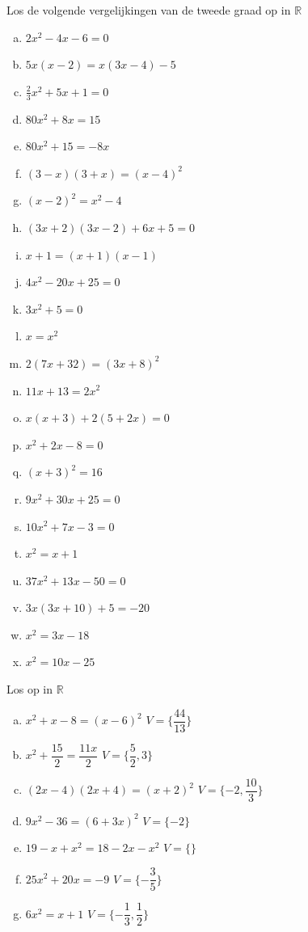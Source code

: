 \documentclass[12pt]{article}
\begin{document}
\begin{oefening}
  Los de volgende vergelijkingen van de tweede graad op in $\mathbb{R}$
  \begin{multicols}{2}
    \begin{enumerate}[(a)]
      \itemsep0.7em
    \item $2x^2-4x-6=0$
    \item $5x(x-2)=x(3x-4)-5$
    \item $\frac{2}{3}x^2+5x+1=0$
    \item $80x^2+8x=15$
    \item $80x^2+15=-8x$
    \item $(3-x)(3+x)=(x-4)^2$
    \item $(x-2)^2=x^2-4$
    \item $(3x+2)(3x-2)+6x+5=0$
    \item $x+1=(x+1)(x-1)$
    \item $4x^2-20x+25=0$
    \item $3x^2+5=0$
    \item $x=x^2$
    \item $2\left(7x+32\right)=(3x+8)^2$
    \item $11x+13=2x^2$
    \item $x\left(x+3\right)+2\left(5+2x\right)=0$
    \item $x^2+2x-8=0$
    \item $(x+3)^2=16$
    \item $9x^2+30x+25=0$
    \item $10x^2+7x-3=0$
    \item $x^2=x+1$
    \item $37x^2+13x-50=0$
    \item $3x(3x+10)+5=-20$
    \item $x^2=3x-18$
    \item $x^2=10x-25$
    \end{enumerate}
  \end{multicols}
\end{oefening}

\begin{oefening}
  Los op in $\mathbb{R}$
  \begin{enumerate}[(a)]
      \itemsep1em
    \item $x^2+x-8=(x-6)^2$ \tabto{6cm} {\color{gray}$V=\{\dfrac{44}{13}\}$}
    \item $x^2+\dfrac{15}{2}=\dfrac{11x}{2}$ \tabto{6cm} {\color{gray}$V=\{\dfrac{5}{2}, 3\}$}
    \item $(2x-4)(2x+4)=(x+2)^2$ \tabto{6cm} {\color{gray}$V=\{-2,\dfrac{10}{3}\}$}
    \item $9x^2-36=(6+3x)^2$ \tabto{6cm} {\color{gray}$V=\{-2\}$}
    \item $19-x+x^2=18-2x-x^2$ \tabto{6cm} {\color{gray}$V=\{\}$}
    \item $25x^2+20x=-9$ \tabto{6cm} {\color{gray}$V=\{-\dfrac{3}{5}\}$}
    \item $6x^2=x+1$ \tabto{6cm} {\color{gray}$V=\{-\dfrac{1}{3},\dfrac{1}{2}\}$}
  \end{enumerate}
\end{oefening}
\end{document}
